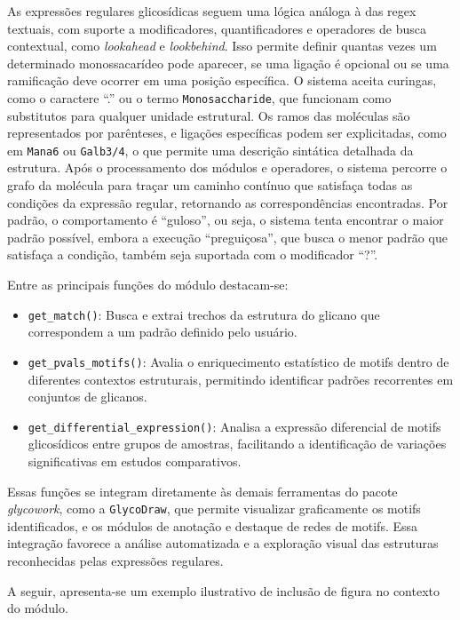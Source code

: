 As expressões regulares glicosídicas seguem uma lógica análoga à das regex
textuais, com suporte a modificadores, quantificadores e operadores de busca
contextual, como \textit{lookahead} e \textit{lookbehind}. Isso permite definir
quantas vezes um determinado monossacarídeo pode aparecer, se uma ligação é
opcional ou se uma ramificação deve ocorrer em uma posição específica. O
sistema aceita curingas, como o caractere “.” ou o termo
\texttt{Monosaccharide}, que funcionam como substitutos para qualquer unidade
estrutural. Os ramos das moléculas são representados por parênteses, e ligações
específicas podem ser explicitadas, como em \texttt{Mana6} ou \texttt{Galb3/4},
o que permite uma descrição sintática detalhada da estrutura. Após o
processamento dos módulos e operadores, o sistema percorre o grafo da molécula
para traçar um caminho contínuo que satisfaça todas as condições da expressão
regular, retornando as correspondências encontradas. Por padrão, o
comportamento é “guloso”, ou seja, o sistema tenta encontrar o maior padrão
possível, embora a execução “preguiçosa”, que busca o menor padrão que
satisfaça a condição, também seja suportada com o modificador “?”.

Entre as principais funções do módulo destacam-se:
\begin{itemize}
	\item \texttt{get\_match()}: Busca e extrai trechos da estrutura do glicano que correspondem a um padrão definido pelo usuário.
	\item \texttt{get\_pvals\_motifs()}: Avalia o enriquecimento estatístico de motifs dentro de diferentes contextos estruturais, permitindo identificar padrões recorrentes em conjuntos de glicanos.
	\item \texttt{get\_differential\_expression()}: Analisa a expressão diferencial de motifs glicosídicos entre grupos de amostras, facilitando a identificação de variações significativas em estudos comparativos.
\end{itemize}

Essas funções se integram diretamente às demais ferramentas do pacote
\textit{glycowork}, como a \texttt{GlycoDraw}, que permite visualizar
graficamente os motifs identificados, e os módulos de anotação e destaque de
redes de motifs. Essa integração favorece a análise automatizada e a exploração
visual das estruturas reconhecidas pelas expressões regulares.

A seguir, apresenta-se um exemplo ilustrativo de inclusão de figura no contexto
do módulo.

